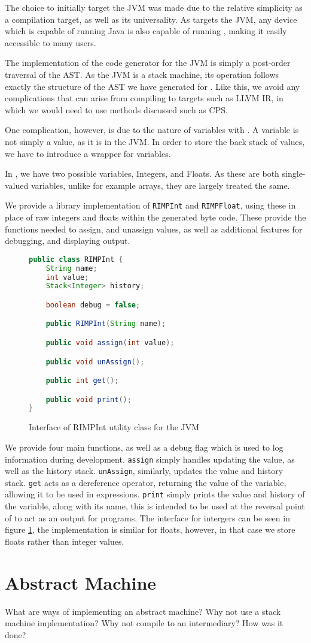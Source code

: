 The choice to initially target the JVM was made due to the relative simplicity as a compilation target, as well as its universality. As \rimp targets the JVM, any device which is capable of running Java is also capable of running \rimp, making it easily accessible to many users. 

The implementation of the code generator for the JVM is simply a post-order traversal of the AST. 
As the JVM is a stack machine, its operation follows exactly the structure of the AST we have generated for \rimplang. Like this, we avoid any complications that can arise from compiling to targets such as LLVM IR, in which we would need to use methods discussed such as CPS. 

One complication, however, is due to the nature of variables with \rimplang. A variable is not simply a value, as it is in the JVM. In order to store the back stack of values, we have to introduce a wrapper for variables.

In \rimp, we have two possible variables, Integers, and Floats. As these are both single-valued variables, unlike for example arrays, they are largely treated the same.

We provide a library implementation of \lstinline{RIMPInt} and \lstinline{RIMPFloat}, using these in place of raw integers and floats within the generated byte code. These provide the functions needed to assign, and unassign values, as well as additional features for debugging, and displaying output.

\begin{figure}[h]
    \centering
    \begin{lstlisting}[language=java,label={lst:RIMPInt},basicstyle=\small]
public class RIMPInt {
    String name;
    int value;
    Stack<Integer> history;

    boolean debug = false;

    public RIMPInt(String name);

    public void assign(int value);

    public void unAssign();

    public int get();

    public void print();
}
    \end{lstlisting}
    \caption{Interface of RIMPInt utility class for the JVM}
    \label{fig:RIMPInt}
\end{figure}

We provide four main functions, as well as a debug flag which is used to log information during \rimp development. \lstinline{assign} simply handles updating the value, as well as the history stack. \lstinline{unAssign}, similarly, updates the value and history stack. \lstinline{get} acts as a dereference operator, returning the value of the variable, allowing it to be used in expressions. \lstinline{print} simply prints the value and history of the variable, along with its name, this is intended to be used at the reversal point of \rimp to act as an output for programs. The interface for intergers can be seen in figure \ref{fig:RIMPInt}, the implementation is similar for floats, however, in that case we store floats rather than integer values.

\section{Abstract Machine}
What are ways of implementing an abstract machine?
Why not use a stack machine implementation?
Why not compile to an intermediary?
How was it done?
